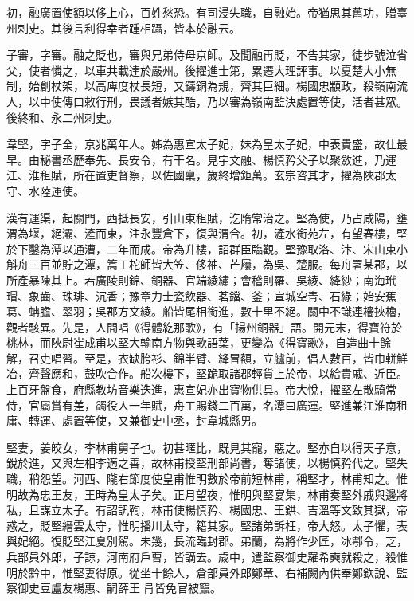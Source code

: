 \begin{pinyinscope}
 初，融廣置使額以侈上心，百姓愁恐。有司浸失職，自融始。帝猶思其舊功，贈臺州刺史。其後言利得幸者踵相躡，皆本於融云。



 子審，字審。融之貶也，審與兄弟侍母京師。及聞融再貶，不告其家，徒步號泣省父，使者憐之，以車共載達於嚴州。後擢進士第，累遷大理評事。以夏楚大小無制，始創杖架，以高庳度杖長短，又鑄銅為規，齊其巨細。楊國忠顓政，殺嶺南流人，以中使傳口敕行刑，畏議者嫉其酷，乃以審為嶺南監決處置等使，活者甚眾。後終和、永二州刺史。



 韋堅，字子全，京兆萬年人。姊為惠宣太子妃，妹為皇太子妃，中表貴盛，故仕最早。由秘書丞歷奉先、長安令，有干名。見宇文融、楊慎矜父子以聚斂進，乃運江、淮租賦，所在置吏督察，以佐國稟，歲終增鉅萬。玄宗咨其才，擢為陜郡太守、水陸運使。



 漢有運渠，起關門，西抵長安，引山東租賦，汔隋常治之。堅為使，乃占咸陽，壅渭為堰，絕灞、滻而東，注永豐倉下，復與渭合。初，滻水銜苑左，有望春樓，堅於下鑿為潭以通漕，二年而成。帝為升樓，詔群臣臨觀。堅豫取洛、汴、宋山東小斛舟三百並貯之潭，篙工柁師皆大笠、侈袖、芒屨，為吳、楚服。每舟署某郡，以所產暴陳其上。若廣陵則錦、銅器、官端綾繡；會稽則羅、吳綾、絳紗；南海玳瑁、象齒、珠琲、沉香；豫章力士瓷飲器、茗鐺、釜；宣城空青、石綠；始安蕉葛、蚺膽、翠羽；吳郡方文綾。船皆尾相銜進，數十里不絕。關中不識連檣挾櫓，觀者駭異。先是，人間唱《得體紇那歌》，有「揚州銅器」語。開元末，得寶符於桃林，而陜尉崔成甫以堅大輸南方物與歌語葉，更變為《得寶歌》，自造曲十餘解，召吏唱習。至是，衣缺胯衫、錦半臂、絳冒額，立艫前，倡人數百，皆巾軿鮮冶，齊聲應和，鼓吹合作。船次樓下，堅跪取諸郡輕貨上於帝，以給貴戚、近臣。上百牙盤食，府縣教坊音樂迭進，惠宣妃亦出寶物供具。帝大悅，擢堅左散騎常侍，官屬賞有差，蠲役人一年賦，舟工賜錢二百萬，名潭曰廣運。堅進兼江淮南租庸、轉運、處置等使，又兼御史中丞，封韋城縣男。



 堅妻，姜皎女，李林甫舅子也。初甚暱比，既見其寵，惡之。堅亦自以得天子意，銳於進，又與左相李適之善，故林甫授堅刑部尚書，奪諸使，以楊慎矜代之。堅失職，稍怨望。河西、隴右節度使皇甫惟明數於帝前短林甫，稱堅才，林甫知之。惟明故為忠王友，王時為皇太子矣。正月望夜，惟明與堅宴集，林甫奏堅外戚與邊將私，且謀立太子。有詔訊鞫，林甫使楊慎矜、楊國忠、王鉷、吉溫等文致其獄，帝惑之，貶堅縉雲太守，惟明播川太守，籍其家。堅諸弟訴枉，帝大怒。太子懼，表與妃絕。復貶堅江夏別駕。未幾，長流臨封郡。弟蘭，為將作少匠，冰鄠令，芝，兵部員外郎，子諒，河南府戶曹，皆謫去。歲中，遣監察御史羅希奭就殺之，殺惟明於黔中，惟堅妻得原。從坐十餘人，倉部員外郎鄭章、右補闕內供奉鄭欽說、監察御史豆盧友楊惠、嗣薛王肙皆免官被竄。




\end{pinyinscope}

